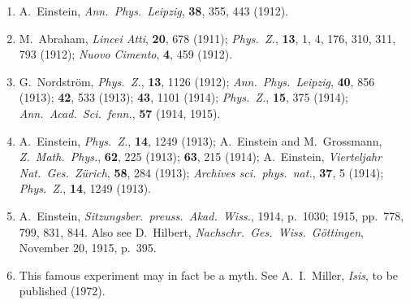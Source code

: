 \begin{enumerate}
  \item {}\label{ch1-ref-35}
  A.\ Einstein, \emph{Ann.\ Phys.\ Leipzig}, \textbf{38}, 355, 443 (1912).

  \item {}\label{ch1-ref-36}
  M.\ Abraham, \emph{Lincei Atti}, \textbf{20}, 678 (1911); \emph{Phys.\ Z.},
  \textbf{13}, 1, 4, 176, 310, 311, 793 (1912); \emph{Nuovo Cimento},
  \textbf{4}, 459 (1912).

  \item {}\label{ch1-ref-37}
  G.\ Nordstr\"om, \emph{Phys.\ Z.}, \textbf{13}, 1126 (1912); \emph{Ann.\
  Phys.\ Leipzig}, \textbf{40}, 856 (1913); \textbf{42}, 533 (1913);
  \textbf{43}, 1101 (1914); \emph{Phys.\ Z.}, \textbf{15}, 375 (1914);
  \emph{Ann.\ Acad.\ Sci.\ fenn.}, \textbf{57} (1914, 1915).

  \item {}\label{ch1-ref-38}
  A.\ Einstein, \emph{Phys.\ Z.}, \textbf{14}, 1249 (1913); A.\ Einstein and
  M.\ Grossmann, \emph{Z.\ Math.\ Phys.}, \textbf{62}, 225 (1913);
  \textbf{63}, 215 (1914); A.\ Einstein, \emph{Vierteljahr Nat.\ Ges.\
  Z\"urich}, \textbf{58}, 284 (1913); \emph{Archives sci.\ phys.\ nat.},
  \textbf{37}, 5 (1914); \emph{Phys.\ Z.}, \textbf{14}, 1249 (1913).

  \item \phantomsection\label{ch1-ref-39}
  A.\ Einstein, \emph{Sitzungsber.\ preuss.\ Akad.\ Wiss.}, 1914, p.\ 1030;
  1915, pp.\ 778, 799, 831, 844. Also see D.\ Hilbert, \emph{Nachschr.\ Ges.\
  Wiss.\ G\"ottingen}, November 20, 1915, p.\ 395.

  \item \phantomsection\label{ch1-ref-40}
  This famous experiment may in fact be a myth. See A.\ I.\ Miller,
  \emph{Isis}, to be published (1972).
\end{enumerate}
